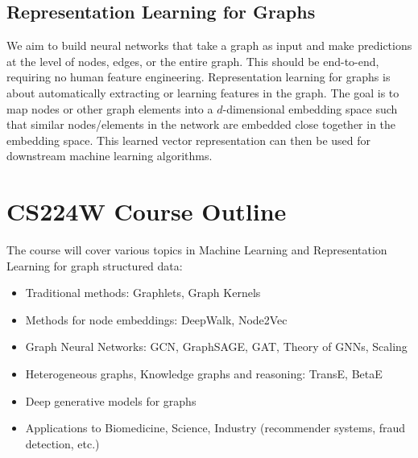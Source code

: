 \documentclass{article}
\begin{document}
\subsection{Representation Learning for Graphs}
We aim to build neural networks that take a graph as input and make predictions at the level of nodes, edges, or the entire graph. This should be end-to-end, requiring no human feature engineering.
Representation learning for graphs is about automatically extracting or learning features in the graph. The goal is to map nodes or other graph elements into a $d$-dimensional embedding space such that similar nodes/elements in the network are embedded close together in the embedding space. This learned vector representation can then be used for downstream machine learning algorithms.
\section{CS224W Course Outline}
The course will cover various topics in Machine Learning and Representation Learning for graph structured data:
\begin{itemize}
    \item Traditional methods: Graphlets, Graph Kernels
    \item Methods for node embeddings: DeepWalk, Node2Vec
    \item Graph Neural Networks: GCN, GraphSAGE, GAT, Theory of GNNs, Scaling
    \item Heterogeneous graphs, Knowledge graphs and reasoning: TransE, BetaE
    \item Deep generative models for graphs
    \item Applications to Biomedicine, Science, Industry (recommender systems, fraud detection, etc.)
\end{itemize}
\end{document}
